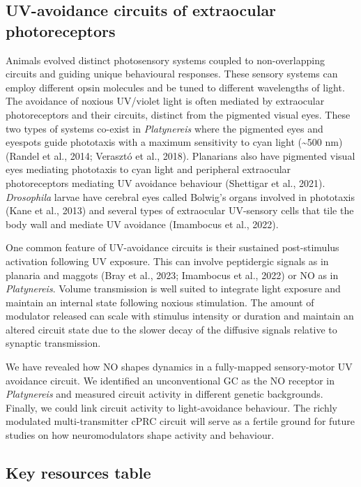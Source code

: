 \documentclass[
  10pt,
  onecolumn]{article}
\begin{document}
\hypertarget{uv-avoidance-circuits-of-extraocular-photoreceptors}{%
\subsection{UV-avoidance circuits of extraocular
photoreceptors}\label{uv-avoidance-circuits-of-extraocular-photoreceptors}}

Animals evolved distinct photosensory systems coupled to non-overlapping
circuits and guiding unique behavioural responses. These sensory systems
can employ different opsin molecules and be tuned to different
wavelengths of light. The avoidance of noxious UV/violet light is often
mediated by extraocular photoreceptors and their circuits, distinct from
the pigmented visual eyes. These two types of systems co-exist in
\emph{Platynereis} where the pigmented eyes and eyespots guide
phototaxis with a maximum sensitivity to cyan light (\textasciitilde500
nm) (Randel et al., 2014; Verasztó et al., 2018). Planarians also have
pigmented visual eyes mediating phototaxis to cyan light and peripheral
extraocular photoreceptors mediating UV avoidance behaviour (Shettigar
et al., 2021). \emph{Drosophila} larvae have cerebral eyes called
Bolwig's organs involved in phototaxis (Kane et al., 2013) and several
types of extraocular UV-sensory cells that tile the body wall and
mediate UV avoidance (Imambocus et al., 2022).

One common feature of UV-avoidance circuits is their sustained
post-stimulus activation following UV exposure. This can involve
peptidergic signals as in planaria and maggots (Bray et al., 2023;
Imambocus et al., 2022) or NO as in \emph{Platynereis}. Volume
transmission is well suited to integrate light exposure and maintain an
internal state following noxious stimulation. The amount of modulator
released can scale with stimulus intensity or duration and maintain an
altered circuit state due to the slower decay of the diffusive signals
relative to synaptic transmission.

We have revealed how NO shapes dynamics in a fully-mapped sensory-motor
UV avoidance circuit. We identified an unconventional GC as the NO
receptor in \emph{Platynereis} and measured circuit activity in
different genetic backgrounds. Finally, we could link circuit activity
to light-avoidance behaviour. The richly modulated multi-transmitter
cPRC circuit will serve as a fertile ground for future studies on how
neuromodulators shape activity and behaviour.

\hypertarget{key-resources-table}{%
\subsection{Key resources table}\label{key-resources-table}}
\end{document}
